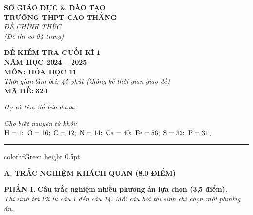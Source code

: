 \documentclass[11pt,a4paper]{article}
\begin{document}
\begin{minipage}[t]{0.48\textwidth}
\textbf{SỞ GIÁO DỤC \& ĐÀO TẠO}\\
\textbf{TRƯỜNG THPT CAO THẮNG}\\
\textit{ĐỀ CHÍNH THỨC}\\
\textit{(Đề thi có 04 trang)}
\end{minipage}
\hfill
\begin{minipage}[t]{0.48\textwidth}
\raggedleft
\textbf{\color{hfRed}ĐỀ KIỂM TRA CUỐI KÌ 1}\\
\textbf{NĂM HỌC 2024 -- 2025}\\
\textbf{MÔN: HÓA HỌC 11}\\
\textit{Thời gian làm bài: 45 phút (không kể thời gian giao đề)}\\
\textbf{MÃ ĐỀ: 324}
\end{minipage}

\vspace{4pt}
\noindent
\textit{Họ và tên:} \dotfill \textit{Số báo danh:} \dotfill

\vspace{3pt}
\noindent
\textit{\footnotesize Cho biết nguyên tử khối: $\ce{H}=1;\ \ce{O}=16;\ \ce{C}=12;\ \ce{N}=14;\ \ce{Ca}=40;\ \ce{Fe}=56;\ \ce{S}=32;\ \ce{P}=31$.}

\vspace{3pt}
\hrule color{hfGreen} height 0.5pt

\vspace{4pt}
\noindent
{\color{mainGreen}\textbf{\Large A. TRẮC NGHIỆM KHÁCH QUAN (8,0 ĐIỂM)}}

\vspace{3pt}
\noindent
{\color{mainGreen}\textbf{\large PHẦN I. Câu trắc nghiệm nhiều phương án lựa chọn (3,5 điểm).}}\\
\textit{\small Thí sinh trả lời từ câu 1 đến câu 14. Mỗi câu hỏi thí sinh chỉ chọn một phương án.}
\vspace{2pt}
\end{document}
